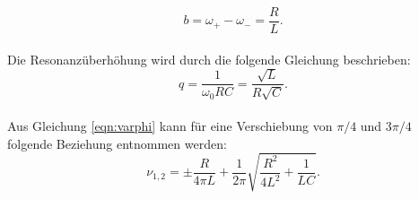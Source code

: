 \begin{equation}
  b = \omega_{+} - \omega_{-} = \frac{R}{L}.
  \label{eqn:halbwertsbreiten}
\end{equation}
\\Die Resonanzüberhöhung wird durch die folgende Gleichung beschrieben:
\begin{equation}
  q = \frac{1}{\omega_{0}RC} = \frac{\sqrt{L}}{R \sqrt{C}}.
  \label{eqn:q}
\end{equation}
\\Aus Gleichung \eqref{eqn:varphi} kann für eine Verschiebung von $\pi/4$ und $3\pi/4$ folgende Beziehung entnommen werden:
\begin{equation}
  \nu_{1,2} = \pm \frac{R}{4 \pi L} + \frac{1}{2 \pi} \sqrt{\frac{R^2}{4 L^2} + \frac{1}{LC} }.
  \label{eqn:phasenverschiebung}
\end{equation}
